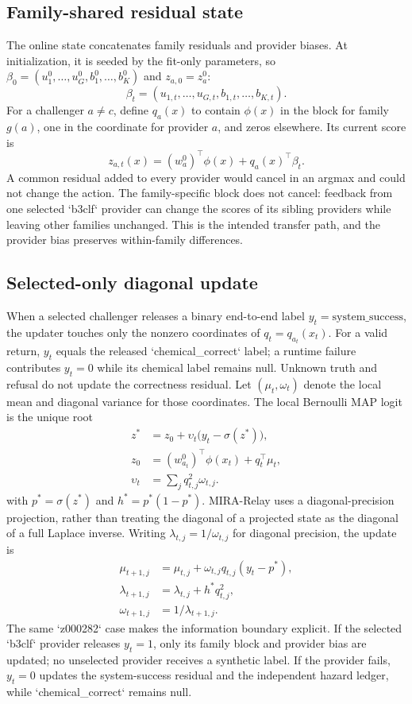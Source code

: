 \documentclass[sigconf,anonymous]{aamas}
\begin{document}
\subsection{Family-shared residual state}
The online state concatenates family residuals and provider biases. At initialization, it is seeded by the fit-only parameters, so $\beta_0=(u_1^0,\ldots,u_G^0,b_1^0,\ldots,b_K^0)$ and $z_{a,0}=z_a^0$:
$$
\beta_t=(u_{1,t},\ldots,u_{G,t},b_{1,t},\ldots,b_{K,t}).
$$
For a challenger $a\neq c$, define $q_a(x)$ to contain $\phi(x)$ in the block for family $g(a)$, one in the coordinate for provider $a$, and zeros elsewhere. Its current score is
$$
z_{a,t}(x)=(w_a^0)^\top\phi(x)+q_a(x)^\top\beta_t.
$$
A common residual added to every provider would cancel in an argmax and could not change the action. The family-specific block does not cancel: feedback from one selected `b3clf` provider can change the scores of its sibling providers while leaving other families unchanged. This is the intended transfer path, and the provider bias preserves within-family differences.

\subsection{Selected-only diagonal update}
When a selected challenger releases a binary end-to-end label $y_t=\mathrm{system\_success}$, the updater touches only the nonzero coordinates of $q_t=q_{a_t}(x_t)$. For a valid return, $y_t$ equals the released `chemical\_correct` label; a runtime failure contributes $y_t=0$ while its chemical label remains null. Unknown truth and refusal do not update the correctness residual. Let $(\mu_t,\omega_t)$ denote the local mean and diagonal variance for those coordinates. The local Bernoulli MAP logit is the unique root
$$
\begin{aligned}
z^*&=z_0+\upsilon_t\bigl(y_t-\sigma(z^*)\bigr),\\
z_0&=(w_{a_t}^0)^\top\phi(x_t)+q_t^\top\mu_t,\\
\upsilon_t&=\sum_j q_{t,j}^2\omega_{t,j}.
\end{aligned}
$$
with $p^*=\sigma(z^*)$ and $h^*=p^*(1-p^*)$. MIRA-Relay uses a diagonal-precision projection, rather than treating the diagonal of a projected state as the diagonal of a full Laplace inverse. Writing $\lambda_{t,j}=1/\omega_{t,j}$ for diagonal precision, the update is
$$
\begin{aligned}
\mu_{t+1,j}&=\mu_{t,j}+\omega_{t,j}q_{t,j}(y_t-p^*),\\
\lambda_{t+1,j}&=\lambda_{t,j}+h^*q_{t,j}^2,\\
\omega_{t+1,j}&=1/\lambda_{t+1,j}.
\end{aligned}
$$
The same `z000282` case makes the information boundary explicit. If the selected `b3clf` provider releases $y_t=1$, only its family block and provider bias are updated; no unselected provider receives a synthetic label. If the provider fails, $y_t=0$ updates the system-success residual and the independent hazard ledger, while `chemical\_correct` remains null.
\end{document}
